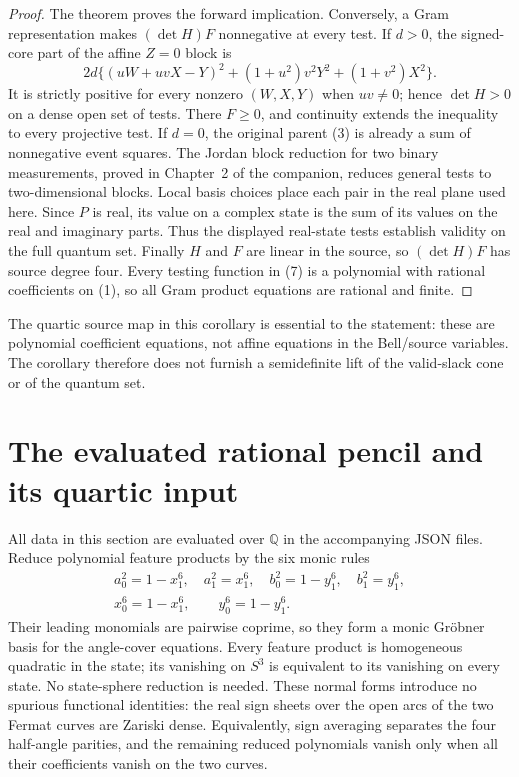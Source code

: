 \documentclass[11pt]{article}
\begin{document}
\begin{proof}
The theorem proves the forward implication.  Conversely, a Gram
representation makes $(\det H)F$ nonnegative at every test.  If $d>0$,
the signed-core part of the affine $Z=0$ block is
\[
 2d\{(uW+uvX-Y)^2+(1+u^2)v^2Y^2+(1+v^2)X^2\}.
\]
It is strictly positive for every nonzero $(W,X,Y)$ when $uv\ne0$;
hence $\det H>0$ on a dense open set of tests.  There $F\geq0$, and
continuity extends the inequality to every projective test.  If $d=0$,
the original parent (3) is already a sum of nonnegative event squares.
The Jordan block reduction for two binary measurements, proved in
Chapter~2 of the companion, reduces general tests to two-dimensional
blocks.  Local basis choices place each pair in the real plane used
here.  Since $P$ is real, its value on a complex state is the sum of
its values on the real and imaginary parts.  Thus the displayed
real-state tests establish validity on the full quantum set.
Finally $H$ and $F$ are linear in the source, so $(\det H)F$ has source
degree four.  Every testing function in (7) is a polynomial with
rational coefficients on (1), so all Gram product equations are
rational and finite.
\end{proof}

The quartic source map in this corollary is essential to the statement:
these are polynomial coefficient equations, not affine equations in
the Bell/source variables.  The corollary therefore does not furnish a
semidefinite lift of the valid-slack cone or of the quantum set.

\section{The evaluated rational pencil and its quartic input}

All data in this section are evaluated over $\mathbb Q$ in the accompanying
JSON files.  Reduce polynomial feature products by the six monic rules
\[
\begin{gathered}
a_0^2=1-x_1^6,\quad a_1^2=x_1^6,\quad
b_0^2=1-y_1^6,\quad b_1^2=y_1^6,\\
x_0^6=1-x_1^6,\qquad y_0^6=1-y_1^6.
\end{gathered}                                                    \tag{17}
\]
Their leading monomials are pairwise coprime, so they form a monic
Gr\"obner basis for the angle-cover equations.  Every feature product
is homogeneous quadratic in the state; its vanishing on $S^3$ is
equivalent to its vanishing on every state.  No state-sphere reduction
is needed.  These normal forms introduce no spurious functional
identities: the real sign sheets over the open arcs of the two Fermat
curves are Zariski dense.  Equivalently, sign averaging separates the
four half-angle parities, and the remaining reduced polynomials vanish
only when all their coefficients vanish on the two curves.
\end{document}
